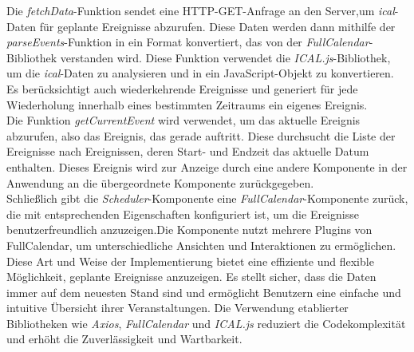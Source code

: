 Die \emph{fetchData}-Funktion sendet eine HTTP-GET-Anfrage an den Server,um \emph{ical}-Daten für geplante Ereignisse abzurufen. Diese Daten werden dann mithilfe der \emph{parseEvents}-Funktion in ein Format konvertiert, das von der \emph{FullCalendar}-Bibliothek verstanden wird. Diese Funktion verwendet die \emph{ICAL.js}-Bibliothek, um die \emph{ical}-Daten zu analysieren und in ein JavaScript-Objekt zu konvertieren. Es berücksichtigt auch wiederkehrende Ereignisse und generiert für jede Wiederholung innerhalb eines bestimmten Zeitraums ein eigenes Ereignis.\\
Die Funktion \emph{getCurrentEvent} wird verwendet, um das aktuelle Ereignis abzurufen, also das Ereignis, das gerade auftritt. Diese durchsucht die Liste der Ereignisse nach Ereignissen, deren Start- und Endzeit das aktuelle Datum enthalten. Dieses Ereignis wird zur Anzeige durch eine andere Komponente in der Anwendung an die übergeordnete Komponente zurückgegeben.\\
Schließlich gibt die \emph{Scheduler}-Komponente eine \emph{FullCalendar}-Komponente zurück, die mit  entsprechenden Eigenschaften konfiguriert ist, um die Ereignisse benutzerfreundlich anzuzeigen.Die Komponente nutzt mehrere Plugins von FullCalendar, um unterschiedliche Ansichten und Interaktionen zu ermöglichen.\\
Diese Art und Weise der Implementierung bietet eine effiziente und flexible Möglichkeit, geplante Ereignisse anzuzeigen. Es stellt sicher, dass die Daten immer auf dem neuesten Stand sind und ermöglicht Benutzern eine einfache und intuitive Übersicht ihrer Veranstaltungen. Die Verwendung etablierter Bibliotheken wie \emph{Axios}, \emph{FullCalendar} und \emph{ICAL.js} reduziert die Codekomplexität und erhöht die Zuverlässigkeit und Wartbarkeit.
